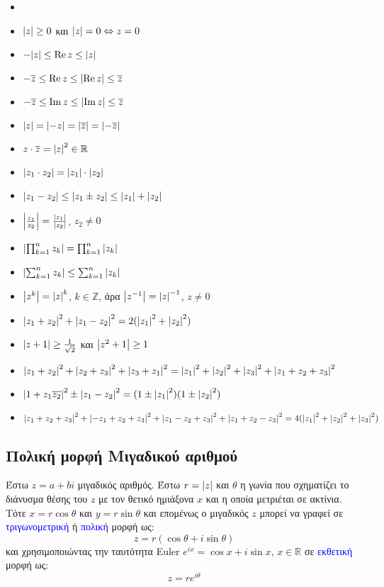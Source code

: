 \begin{itemize}
  \item []
  \item $\abs{z}\geq 0$ και $\abs{z}=0 \Leftrightarrow z=0$
  \item $-\abs{z}\leq \Re z \leq \abs{z}$
  \item $-\overline{z}\leq \Re z \leq \abs{\Re z}\leq \overline{z}$
  \item $-\overline{z}\leq \Im z \leq \abs{\Im z}\leq \overline{z}$
  \item $\abs{z}=\abs{-z}=\abs{\overline{z}}=\abs{-\overline{z}}$
  \item $z\cdot\overline{z}=\abs{z}^{2}\in\mathbb{R}$
  \item $\abs{z_{1}\cdot z_{2}}=\abs{z_{1}}\cdot \abs{z_{2}}$
  \item $\abs{z_{1}-z_{2}}\leq\abs{z_{1}\pm z_{2}}\leq \abs{z_{1}}+\abs{z_{2}}$
  \item $\abs{\frac{z_{1}}{z_{2}}}=\frac{\abs{z_{1}}}{\abs{z_{2}}}$, $z_{2}\neq 0$
  \item $\abs{\prod_{k=1}^{n}z_{k}}=\prod_{k=1}^{n}\abs{z_{k}}$
  \item $\abs{\sum_{k=1}^{n}z_{k}}\leq \sum_{k=1}^{n}\abs{z_{k}}$
  \item $\abs{z^{k}}=\abs{z}^{k}$, $k\in\mathbb{Z}$, άρα $\abs{z^{-1}}=\abs{z}^{-1}$, $z\neq 0$
  \item $\abs{z_{1}+z_{2}}^{2}+\abs{z_{1}-z_{2}}^{2}=2(\abs{z_{1}}^{2}+\abs{z_{2}}^{2})$
  \item $\abs{z+1}\geq\frac{1}{\sqrt{2}}$ και $\abs{z^{2}+1}\geq 1$
  \item $\abs{z_{1}+z_{2}}^{2}+\abs{z_{2}+z_{3}}^{2}+\abs{z_{3}+z_{1}}^{2}=\abs{z_{1}}^{2}+\abs{z_{2}}^{2}+\abs{z_{3}}^{2}+\abs{z_{1}+z_{2}+z_{3}}^{2}$
  \item $\abs{1+z_{1}\overline{z_{2}}}^{2}\pm\abs{z_{1}-z_{2}}^{2}=(1\pm\abs{z_{1}}^{2})(1\pm\abs{z_{2}}^{2})$
  \item $\abs{z_{1}+z_{2}+z_{3}}^{2}+\abs{-z_{1}+z_{2}+z_{3}}^{2}+\abs{z_{1}-z_{2}+z_{3}}^{2}+\abs{z_{1}+z_{2}-z_{3}}^{2}=4(\abs{z_{1}}^{2}+\abs{z_{2}}^{2}+\abs{z_{3}}^{2})$
\end{itemize}

\subsection*{Πολική μορφή Μιγαδικού αριθμού}

Έστω $z=a+bi$ μιγαδικός αριθμός. Έστω $r=\abs{z}$ και $\theta$ η γωνία που σχηματίζει το διάνυσμα θέσης του $z$ με τον θετικό ημιάξονα $x$ και η οποία μετριέται σε ακτίνια. Τότε $x=r\cos \theta$ και $y=r\sin \theta$ και επομένως ο μιγαδικός $z$ μπορεί να γραφεί σε \textcolor{blue}{τριγωνομετρική} ή \textcolor{blue}{πολική} μορφή ως:
\[
z=r(\cos\theta+i\sin\theta)
\]
και χρησιμοποιώντας την ταυτότητα \textlatin{Euler} $e^{ix}=\cos x+i\sin x$, $x\in\mathbb{R}$ σε \textcolor{blue}{εκθετική} μορφή ως:
\[
    z= re^{i\theta}
\]


